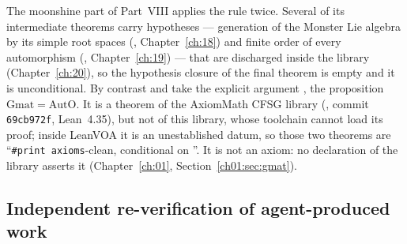 The moonshine part of Part~VIII applies the rule twice. Several of its intermediate theorems carry hypotheses ---
generation of the Monster Lie algebra by its simple root spaces (, Chapter~\ref{ch:18}) and finite order of
every automorphism (, Chapter~\ref{ch:19}) --- that are discharged inside the library (Chapter~\ref{ch:20}),
so the hypothesis closure of the final theorem  is empty and it is
unconditional. By contrast  and  take the explicit argument
, the proposition $\mathrm{Gmat}=\mathrm{AutO}$. It is a theorem of the AxiomMath CFSG library
(, commit \texttt{69cb972f}, Lean~4.35), but not of this
library, whose toolchain cannot load its proof; inside LeanVOA it is an unestablished datum, so those two theorems are
``\texttt{\#print axioms}-clean, conditional on ''. It is not an axiom: no declaration of the library
asserts it (Chapter~\ref{ch:01}, Section~\ref{ch01:sec:gmat}).

\subsection{Independent re-verification of agent-produced work}\label{ch15:sec:agents}

